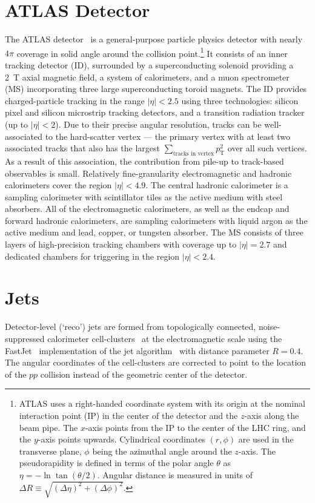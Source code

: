 \newcommand{\AtlasCoordFootnote}{
ATLAS uses a right-handed coordinate system with its origin at the nominal interaction point (IP)
in the center of the detector and the $z$-axis along the beam pipe.
The $x$-axis points from the IP to the center of the LHC ring,
and the $y$-axis points upwards.
Cylindrical coordinates $(r,\phi)$ are used in the transverse plane, 
$\phi$ being the azimuthal angle around the $z$-axis.
The pseudorapidity is defined in terms of the polar angle $\theta$ as $\eta = -\ln \tan(\theta/2)$.
Angular distance is measured in units of $\Delta R \equiv \sqrt{(\Delta\eta)^{2} + (\Delta\phi)^{2}}$.}


\section{ATLAS Detector}
\label{sec:ATLAS:ATLAS}
The ATLAS detector~\cite{PERF-2007-01} is a general-purpose particle physics detector 
%
with nearly $4\pi$ coverage in solid angle around the collision point.\footnote{\AtlasCoordFootnote}
%
It consists of an inner tracking detector (ID),  surrounded by a superconducting solenoid providing a \SI{2}{\tesla} axial magnetic field, a system of calorimeters, and a muon spectrometer (MS) incorporating three large superconducting toroid magnets.  
The ID provides charged-particle tracking in the range $|\eta| < 2.5$ using three technologies: silicon pixel and silicon microstrip tracking detectors, and a transition radiation tracker (up to $|\eta| < 2$).  Due to their precise angular resolution, tracks can be well-associated to the hard-scatter vertex — the primary vertex with at least two associated tracks that also has the largest $\sum_\text{tracks in vertex} p_\text{T}^2$ over all such vertices.  As a result of this association, the contribution from pile-up to track-based observables is small.  
%
%
Relatively fine-granularity electromagnetic and hadronic calorimeters cover the region $|\eta| < 4.9$. 
The central hadronic calorimeter is a sampling calorimeter with scintillator tiles as the active medium with steel absorbers. All of the electromagnetic calorimeters, as well as the endcap and forward hadronic calorimeters, are sampling calorimeters with liquid argon as the active medium and lead, copper, or tungsten absorber.
%
%
The MS consists of three layers of high-precision tracking chambers with coverage up to $|\eta|=2.7$ and dedicated chambers for triggering in the region $|\eta|<2.4$. 


\section{Jets}
\label{sec:ATLAS:jets}
Detector-level (`reco') jets are formed from topologically connected, noise-suppressed calorimeter cell-clusters~\cite{PERF-2014-07} at the electromagnetic scale using the FastJet~\cite{Cacciari:2011ma} implementation of the \antikt jet algorithm~\cite{Cacciari:2008gp} with distance parameter $R = 0.4$.   The angular coordinates of the cell-clusters are corrected to point to the location of the $pp$ collision instead of the geometric center of the detector.  

